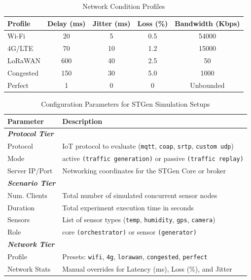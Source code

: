 \documentclass[jsan,article,submit,moreauthors,pdftex]{Definitions/mdpi}
\begin{document}
\begin{table}[!t]
\centering
\caption{Network Condition Profiles}
\label{tab:net-profiles}
\begin{tabular}{p{3cm} c c c c}
\hline
\textbf{Profile} & \textbf{Delay (ms)} & \textbf{Jitter (ms)} & \textbf{Loss (\%)} & \textbf{Bandwidth (Kbps)} \\ \hline
Wi-Fi & 20 & 5 & 0.5 & 54000 \\
4G/LTE & 70 & 10 & 1.2 & 15000 \\
LoRaWAN & 600 & 40 & 2.5 & 50 \\
Congested & 150 & 30 & 5.0 & 1000 \\
Perfect & 1 & 0 & 0 & Unbounded \\
\hline
\end{tabular}
\end{table}


\begin{table}[ht]
\centering
\footnotesize
\caption{Configuration Parameters for STGen Simulation Setups}
\label{tab:stgen_params}
\renewcommand{\arraystretch}{1.25}
\begin{tabularx}{\columnwidth}{l X}
\hline
\textbf{Parameter} & \textbf{Description} \\
\hline
\textit{\textbf{Protocol Tier}} & \\
Protocol & {IoT} protocol to evaluate (\texttt{mqtt}, \texttt{coap}, \texttt{srtp}, \texttt{custom udp}) \\
Mode & active \texttt{(traffic generation)} or passive \texttt{(traffic replay)} \\
Server IP/Port & Networking coordinates for the STGen Core or broker \\
\hline
\textit{\textbf{Scenario Tier}} & \\
Num. Clients & Total number of simulated concurrent sensor nodes \\
Duration & Total experiment execution time in seconds \\
Sensors & List of sensor types (\texttt{temp}, \texttt{humidity}, \texttt{gps}, \texttt{camera}) \\
Role & core \texttt{(orchestrator)} or sensor \texttt{(generator)} \\
\hline
\textit{\textbf{Network Tier}} & \\
Profile & Presets: \texttt{wifi}, \texttt{4g}, \texttt{lorawan}, \texttt{congested}, \texttt{perfect} \\
Network Stats & Manual overrides for Latency (ms), Loss (\%), and Jitter \\
\hline
\end{tabularx}
\end{table}
\end{document}
